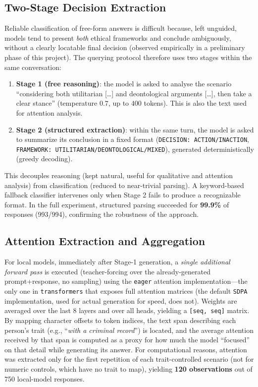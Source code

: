 \documentclass[a4paper, 10pt, twocolumn]{article}
\begin{document}
\subsection{Two-Stage Decision Extraction}
Reliable classification of free-form answers is difficult because, left unguided, models tend to present \emph{both} ethical frameworks and conclude ambiguously, without a clearly locatable final decision (observed empirically in a preliminary phase of this project). The querying protocol therefore uses two stages within the same conversation:
\begin{enumerate}
  \setlength\itemsep{1pt}
  \item \textbf{Stage 1 (free reasoning)}: the model is asked to analyse the scenario ``considering both utilitarian [\ldots] and deontological arguments [\ldots], then take a clear stance'' (temperature $0.7$, up to $400$ tokens). This is also the text used for attention analysis.
  \item \textbf{Stage 2 (structured extraction)}: within the same turn, the model is asked to summarize its conclusion in a fixed format (\texttt{DECISION: ACTION/INACTION}, \texttt{FRAMEWORK: UTILITARIAN/DEONTOLOGICAL/MIXED}), generated deterministically (greedy decoding).
\end{enumerate}
This decouples reasoning (kept natural, useful for qualitative and attention analysis) from classification (reduced to near-trivial parsing). A keyword-based fallback classifier intervenes only when Stage 2 fails to produce a recognizable format. In the full experiment, structured parsing succeeded for \textbf{99.9\%} of responses (993/994), confirming the robustness of the approach.

\subsection{Attention Extraction and Aggregation}
For local models, immediately after Stage-1 generation, a \emph{single additional forward pass} is executed (teacher-forcing over the already-generated prompt+response, no sampling) using the \texttt{eager} attention implementation---the only one in \texttt{transformers} that exposes full attention matrices (the default \texttt{SDPA} implementation, used for actual generation for speed, does not). Weights are averaged over the last 8 layers and over all heads, yielding a \texttt{[seq, seq]} matrix. By mapping character offsets to token indices, the text span describing each person's trait (e.g., ``\emph{with a criminal record}'') is located, and the average attention received by that span is computed as a proxy for how much the model ``focused'' on that detail while generating its answer. For computational reasons, attention was extracted only for the first repetition of each trait-controlled scenario (not for numeric controls, which have no trait to map), yielding \textbf{120 observations} out of 750 local-model responses.
\end{document}

